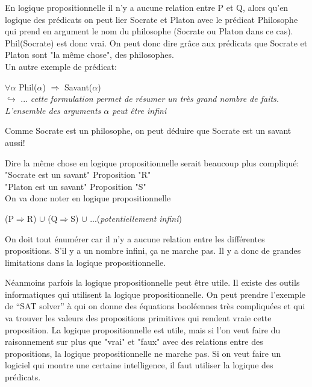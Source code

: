En logique propositionnelle il n'y a aucune relation entre P et Q, alors qu'en logique des prédicats on peut lier Socrate et Platon avec le prédicat Philosophe qui prend en argument le nom du philosophe (Socrate ou Platon dans ce cas). Phil(Socrate) est donc vrai. On peut donc dire grâce aux prédicats que Socrate et Platon sont "la même chose", des philosophes.\\

Un autre exemple de prédicat:

\begin{center}
$\forall \alpha$ Phil($\alpha$) $\Rightarrow$ Savant($\alpha$)\\
\vspace{3mm}
$\hookrightarrow$ ... \textit{cette formulation permet de résumer un très grand nombre de faits. L'ensemble des arguments $\alpha$ peut être infini}
\end{center}
Comme Socrate est un philosophe, on peut déduire que Socrate est un savant aussi!

Dire la même chose en logique propositionnelle serait beaucoup plus compliqué: \\

"Socrate est un savant" Proposition "R"\\
\indent "Platon est un savant" Proposition "S"\\

On va donc noter en logique propositionnelle
\begin{center}
(P$\Rightarrow$R) $\cup$ (Q$\Rightarrow$S) $\cup$ ...(\textit{potentiellement infini})
\end{center}

On doit tout énumérer car il n'y a aucune relation entre les différentes propositions. S'il y a un nombre infini, ça ne marche pas. Il y a donc de grandes limitations dans la logique propositionnelle.

Néanmoins parfois la logique propositionnelle peut être utile. 
Il existe des outils informatiques qui utilisent la logique propositionnelle. On peut prendre l'exemple de ``SAT solver'' à qui on donne des équations booléennes très compliquées et qui va trouver les valeurs des propositions primitives qui rendent vraie cette proposition.
La logique propositionnelle est utile, mais si l'on veut faire du raisonnement sur plus que  "vrai" et "faux" avec des relations entre des propositions,  la logique propositionnelle ne marche pas. Si on veut faire un logiciel qui montre une certaine intelligence, il faut utiliser la logique des prédicats.\\

